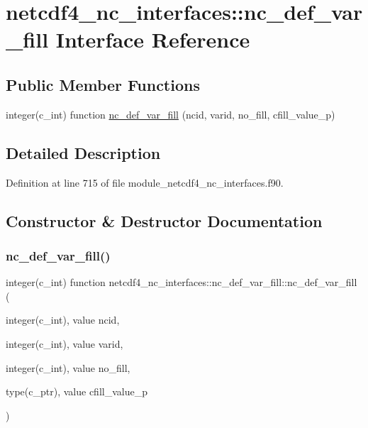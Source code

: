 \hypertarget{interfacenetcdf4__nc__interfaces_1_1nc__def__var__fill}{}\section{netcdf4\+\_\+nc\+\_\+interfaces\+:\+:nc\+\_\+def\+\_\+var\+\_\+fill Interface Reference}
\label{interfacenetcdf4__nc__interfaces_1_1nc__def__var__fill}
\subsection*{Public Member Functions}
\begin{DoxyCompactItemize}
\item 
integer(c\+\_\+int) function \hyperlink{interfacenetcdf4__nc__interfaces_1_1nc__def__var__fill_a119c85b9add1db6852b0d0a9ba23d588}{nc\+\_\+def\+\_\+var\+\_\+fill} (ncid, varid, no\+\_\+fill, cfill\+\_\+value\+\_\+p)
\end{DoxyCompactItemize}


\subsection{Detailed Description}


Definition at line 715 of file module\+\_\+netcdf4\+\_\+nc\+\_\+interfaces.\+f90.



\subsection{Constructor \& Destructor Documentation}
\mbox{\label{interfacenetcdf4__nc__interfaces_1_1nc__def__var__fill_a119c85b9add1db6852b0d0a9ba23d588}} 
\subsubsection{\texorpdfstring{nc\+\_\+def\+\_\+var\+\_\+fill()}{nc\_def\_var\_fill()}}
{\footnotesize\ttfamily integer(c\+\_\+int) function netcdf4\+\_\+nc\+\_\+interfaces\+::nc\+\_\+def\+\_\+var\+\_\+fill\+::nc\+\_\+def\+\_\+var\+\_\+fill (\begin{DoxyParamCaption}\item[{integer(c\+\_\+int), value}]{ncid,  }\item[{integer(c\+\_\+int), value}]{varid,  }\item[{integer(c\+\_\+int), value}]{no\+\_\+fill,  }\item[{type(c\+\_\+ptr), value}]{cfill\+\_\+value\+\_\+p }\end{DoxyParamCaption})}



